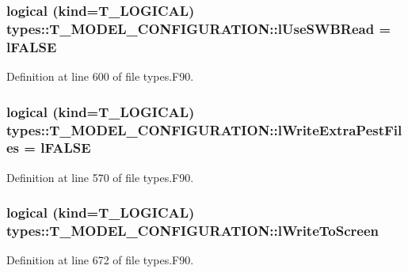 \hypertarget{typetypes_1_1_t___m_o_d_e_l___c_o_n_f_i_g_u_r_a_t_i_o_n_a0e590e3b9e915036057f5d6e22cb1b22}{
\subsubsection[{lUseSWBRead}]{\setlength{\rightskip}{0pt plus 5cm}logical (kind={\bf T\_\-LOGICAL}) {\bf types::T\_\-MODEL\_\-CONFIGURATION::lUseSWBRead} = {\bf lFALSE}}}
\label{typetypes_1_1_t___m_o_d_e_l___c_o_n_f_i_g_u_r_a_t_i_o_n_a0e590e3b9e915036057f5d6e22cb1b22}


Definition at line 600 of file types.F90.

\hypertarget{typetypes_1_1_t___m_o_d_e_l___c_o_n_f_i_g_u_r_a_t_i_o_n_a213657df8f8f480677cb2fd9b803f51f}{
\subsubsection[{lWriteExtraPestFiles}]{\setlength{\rightskip}{0pt plus 5cm}logical (kind={\bf T\_\-LOGICAL}) {\bf types::T\_\-MODEL\_\-CONFIGURATION::lWriteExtraPestFiles} = {\bf lFALSE}}}
\label{typetypes_1_1_t___m_o_d_e_l___c_o_n_f_i_g_u_r_a_t_i_o_n_a213657df8f8f480677cb2fd9b803f51f}


Definition at line 570 of file types.F90.

\hypertarget{typetypes_1_1_t___m_o_d_e_l___c_o_n_f_i_g_u_r_a_t_i_o_n_a2898e9be8cf6fc32a7888d2fb998a0ae}{
\subsubsection[{lWriteToScreen}]{\setlength{\rightskip}{0pt plus 5cm}logical (kind={\bf T\_\-LOGICAL}) {\bf types::T\_\-MODEL\_\-CONFIGURATION::lWriteToScreen}}}
\label{typetypes_1_1_t___m_o_d_e_l___c_o_n_f_i_g_u_r_a_t_i_o_n_a2898e9be8cf6fc32a7888d2fb998a0ae}


Definition at line 672 of file types.F90.

